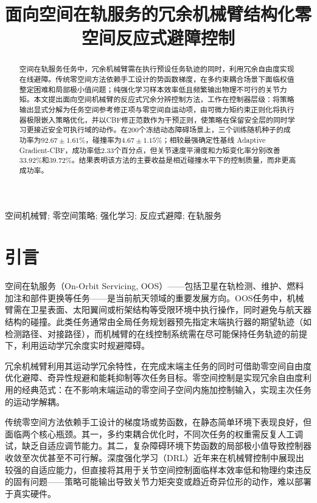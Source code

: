 \documentclass[10pt,conference]{IEEEtran}
\title{面向空间在轨服务的冗余机械臂结构化零空间反应式避障控制}
\author{
  \IEEEauthorblockN{Xie Yang}
}
\begin{document}
\maketitle

\begin{abstract}
\noindent
空间在轨服务任务中，冗余机械臂需在执行预设任务轨迹的同时，利用冗余自由度实现在线避障。传统零空间方法依赖手工设计的势函数梯度，在多约束耦合场景下面临权值整定困难和局部极小值问题；纯强化学习样本效率低且频繁输出物理不可行的关节力矩。本文提出面向空间机械臂的反应式冗余分辨控制方法，工作在控制器层级：将策略输出显式分解为任务空间参考修正项与零空间自运动项，由可微力矩约束正则化将执行器极限嵌入策略优化，并以CBF修正范数作为干预正则，使策略在保留安全层的同时学习更接近安全可执行域的动作。在200个冻结动态障碍场景上，三个训练随机种子的成功率为$92.67\pm1.61\%$，碰撞率为$4.67\pm1.15\%$；相较最强确定性基线 Adaptive Gradient-CBF，成功率低2.33个百分点，但关节速度平滑度和力矩变化率分别改善33.92\%和39.72\%。结果表明该方法的主要收益是相近碰撞水平下的控制质量，而非更高成功率。
\end{abstract}

\begin{IEEEkeywords}
空间机械臂; 零空间策略; 强化学习; 反应式避障; 在轨服务
\end{IEEEkeywords}

\section{引言}

空间在轨服务（On-Orbit Servicing, OOS）——包括卫星在轨检测、维护、燃料加注和部件更换等任务——是当前航天领域的重要发展方向。OOS任务中，机械臂需在卫星表面、太阳翼间或桁架结构等受限环境中执行操作，同时避免与航天器结构的碰撞。此类任务通常由全局任务规划器预先指定末端执行器的期望轨迹（如检测路径、对接路径），而机械臂的在线控制系统需在尽可能保持任务轨迹的前提下，利用运动学冗余度实时规避障碍。

冗余机械臂利用其运动学冗余特性，在完成末端主任务的同时可借助零空间自由度优化避障、奇异性规避和能耗抑制等次任务目标。零空间控制是实现冗余自由度利用的经典范式：在不影响末端运动的零空间子空间内施加控制输入，实现主次任务的运动学解耦。

传统零空间方法依赖手工设计的梯度场或势函数\cite{siciliano1991general}，在静态简单环境下表现良好，但面临两个核心瓶颈。其一，多约束耦合优化时，不同次任务的权重需反复人工调试，缺乏自适应调节能力。其二，复杂障碍环境下势函数的局部极小值导致控制器收敛至次优甚至不可行解。深度强化学习（DRL）近年来在机械臂控制中展现出较强的自适应能力\cite{levine2016end}，但直接将其用于关节空间控制面临样本效率低和物理约束违反的固有问题——策略可能输出导致关节力矩突变或趋近奇异位形的动作，难以部署于真实硬件。
\end{document}
